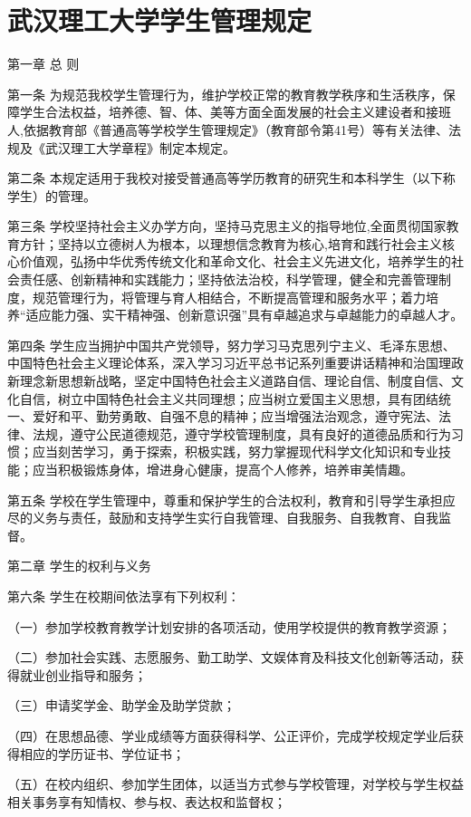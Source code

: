 \documentclass[UTF8,12pt,a4paper]{report}
\begin{document}
		\chapter{武汉理工大学学生管理规定}
第一章    总 则

第一条 为规范我校学生管理行为，维护学校正常的教育教学秩序和生活秩序，保障学生合法权益，培养德、智、体、美等方面全面发展的社会主义建设者和接班人,依据教育部《普通高等学校学生管理规定》（教育部令第41号）等有关法律、法规及《武汉理工大学章程》制定本规定。

第二条 本规定适用于我校对接受普通高等学历教育的研究生和本科学生（以下称学生）的管理。

第三条 学校坚持社会主义办学方向，坚持马克思主义的指导地位,全面贯彻国家教育方针；坚持以立德树人为根本，以理想信念教育为核心,培育和践行社会主义核心价值观，弘扬中华优秀传统文化和革命文化、社会主义先进文化，培养学生的社会责任感、创新精神和实践能力；坚持依法治校，科学管理，健全和完善管理制度，规范管理行为，将管理与育人相结合，不断提高管理和服务水平；着力培养“适应能力强、实干精神强、创新意识强”具有卓越追求与卓越能力的卓越人才。

第四条 学生应当拥护中国共产党领导，努力学习马克思列宁主义、毛泽东思想、中国特色社会主义理论体系，深入学习习近平总书记系列重要讲话精神和治国理政新理念新思想新战略，坚定中国特色社会主义道路自信、理论自信、制度自信、文化自信，树立中国特色社会主义共同理想；应当树立爱国主义思想，具有团结统一、爱好和平、勤劳勇敢、自强不息的精神；应当增强法治观念，遵守宪法、法律、法规，遵守公民道德规范，遵守学校管理制度，具有良好的道德品质和行为习惯；应当刻苦学习，勇于探索，积极实践，努力掌握现代科学文化知识和专业技能；应当积极锻炼身体，增进身心健康，提高个人修养，培养审美情趣。

第五条 学校在学生管理中，尊重和保护学生的合法权利，教育和引导学生承担应尽的义务与责任，鼓励和支持学生实行自我管理、自我服务、自我教育、自我监督。



第二章 学生的权利与义务

第六条 学生在校期间依法享有下列权利：

（一）参加学校教育教学计划安排的各项活动，使用学校提供的教育教学资源；

（二）参加社会实践、志愿服务、勤工助学、文娱体育及科技文化创新等活动，获得就业创业指导和服务；

（三）申请奖学金、助学金及助学贷款；

（四）在思想品德、学业成绩等方面获得科学、公正评价，完成学校规定学业后获得相应的学历证书、学位证书；

（五）在校内组织、参加学生团体，以适当方式参与学校管理，对学校与学生权益相关事务享有知情权、参与权、表达权和监督权；
\end{document}
